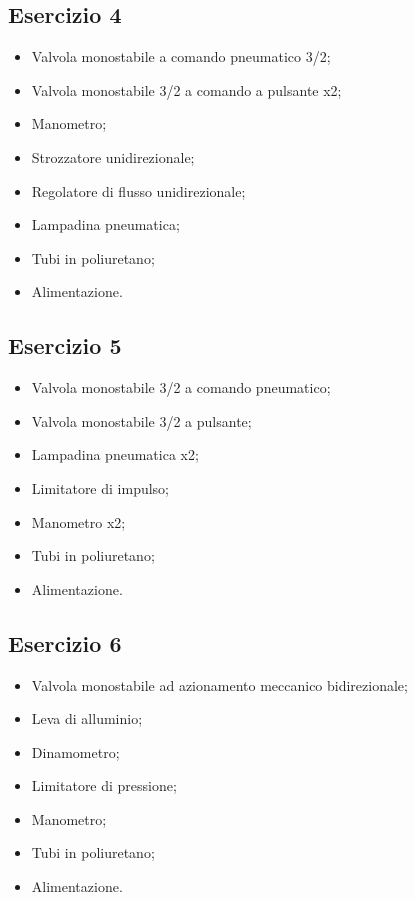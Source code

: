 \documentclass[a4paper]{article}
\begin{document}
\subsection{Esercizio 4}
\begin{itemize}
\item Valvola monostabile a comando pneumatico 3/2;
\item Valvola monostabile 3/2 a comando a pulsante x2;
\item Manometro;
\item Strozzatore unidirezionale;
\item Regolatore di flusso unidirezionale;
\item Lampadina pneumatica;
\item Tubi in poliuretano;
\item Alimentazione.
\end{itemize}

\subsection{Esercizio 5}
\begin{itemize}
\item Valvola monostabile 3/2 a comando pneumatico;
\item Valvola monostabile 3/2 a pulsante;
\item Lampadina pneumatica x2;
\item Limitatore di impulso;
\item Manometro x2;
\item Tubi in poliuretano;
\item Alimentazione.
\end{itemize}

\subsection{Esercizio 6}
\begin{itemize}
\item Valvola monostabile ad azionamento meccanico bidirezionale;
\item Leva di alluminio;
\item Dinamometro;
\item Limitatore di pressione;
\item Manometro;
\item Tubi in poliuretano;
\item Alimentazione.
\end{itemize}
\end{document}
